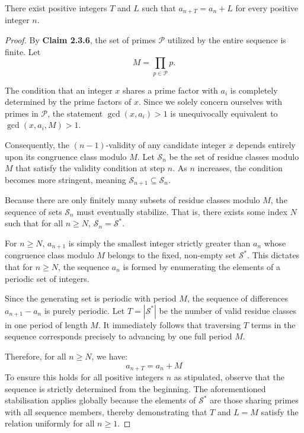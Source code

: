 \documentclass[11pt]{article}
\begin{document}
\begin{theorem}
    There exist positive integers $T$ and $L$ such that $a_{n+T} = a_n + L$ for every positive integer $n$.
\end{theorem}
\begin{proof}
    By \textcolor{GlacierBlue}{\textbf{Claim 2.3.6}}, the set of primes $\mathcal{P}$ utilized by the entire sequence is finite. Let $$M = \prod_{p \in \mathcal{P}} p.$$

\medskip
The condition that an integer $x$ shares a prime factor with $a_i$ is completely determined by the prime factors of $x$. Since we solely concern ourselves with primes in $\mathcal{P}$, the statement $\gcd(x, a_i) > 1$ is unequivocally equivalent to $\gcd(x, a_i, M) > 1$.

\medskip
Consequently, the $(n-1)$-validity of any candidate integer $x$ depends entirely upon its congruence class modulo $M$. Let $\mathcal{S}_n$ be the set of residue classes modulo $M$ that satisfy the validity condition at step $n$. As $n$ increases, the condition becomes more stringent, meaning $\mathcal{S}_{n+1} \subseteq \mathcal{S}_n$.

\medskip
Because there are only finitely many subsets of residue classes modulo $M$, the sequence of sets $\mathcal{S}_n$ must eventually stabilize. That is, there exists some index $N$ such that for all $n \geqslant N$, $\mathcal{S}_n = \mathcal{S}^*$.

\medskip
For $n \geqslant N$, $a_{n+1}$ is simply the smallest integer strictly greater than $a_n$ whose congruence class modulo $M$ belongs to the fixed, non-empty set $\mathcal{S}^*$. This dictates that for $n \geqslant N$, the sequence $a_n$ is formed by enumerating the elements of a periodic set of integers.

\medskip
Since the generating set is periodic with period $M$, the sequence of differences $a_{n+1} - a_n$ is purely periodic. Let $T = |\mathcal{S}^*|$ be the number of valid residue classes in one period of length $M$. It immediately follows that traversing $T$ terms in the sequence corresponds precisely to advancing by one full period $M$.

\medskip
Therefore, for all $n \geqslant N$, we have:
$$ \boxed{a_{n+T} = a_n + M} $$To ensure this holds for all positive integers $n$ as stipulated, observe that the sequence is strictly determined from the beginning. The aforementioned stabilisation applies globally because the elements of $\mathcal{S}^*$ are those sharing primes with all sequence members, thereby demonstrating that $T$ and $L = M$ satisfy the relation uniformly for all $n\geqslant 1$. 
\end{proof}
\newpage
\end{document}
